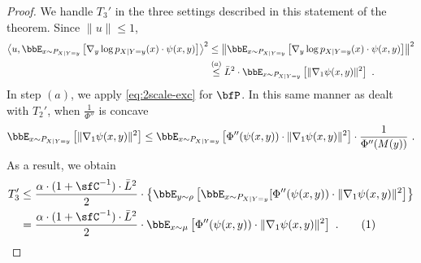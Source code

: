 \documentclass[11pt]{article}
\newcommand{\numberthis}{\addtocounter{equation}{1}\tag{\theequation}}
\begin{document}
\begin{proof}
We handle \(T_{3}'\) in the three settings described in this statement of the theorem.
Since \(\|u\| \leq 1\),
\begin{align*}
    \left\langle u, \bbE_{x \sim P_{X | Y = y}}\left[\nabla_{y}\log p_{X | Y = y}(x) \cdot \psi(x, y)\right]\right\rangle^{2} &\leq \left\|\bbE_{x \sim P_{X | Y = y}}\left[\nabla_{y}\log p_{X | Y = y}(x) \cdot \psi(x, y)\right]\right\|^{2} \\
    &\overset{(a)}\leq \bar{L}^{2} \cdot \bbE_{x \sim P_{X | Y = y}}\left[\|\nabla_{1}\psi(x, y)\|^{2}\right]~.
\end{align*}
In step \((a)\), we apply \ref{eq:2scale-exc} for \(\bfP\).
In this same manner as dealt with \(T_{2}'\), when \(\frac{1}{\Phi''}\) is concave
\begin{equation*}
    \bbE_{x \sim P_{X | Y = y}}\left[\|\nabla_{1}\psi(x, y)\|^{2}\right] \leq \bbE_{x \sim P_{X | Y = y}}\left[\Phi''(\psi(x, y)) \cdot \|\nabla_{1}\psi(x, y)\|^{2}\right] \cdot \frac{1}{\Phi''(M(y))}~.
\end{equation*}
As a result, we obtain
\begin{align*}
    T_{3}' &\leq \frac{\alpha \cdot (1 + \sfC^{-1}) \cdot \bar{L}^{2}}{2} \cdot \left\{\bbE_{y \sim \rho}\left[\bbE_{x \sim P_{X | Y = y}}[\Phi''(\psi(x, y)) \cdot \|\nabla_{1}\psi(x, y)\|^{2}\right]\right\} \\
    &= \frac{\alpha \cdot (1 + \sfC^{-1}) \cdot \bar{L}^{2}}{2} \cdot \bbE_{x \sim \mu}\left[\Phi''(\psi(x, y)) \cdot \|\nabla_{1}\psi(x, y)\|^{2}\right]~.\numberthis\label{eq:T3dash-bound-phisi}
\end{align*}


\end{proof}
\end{document}
